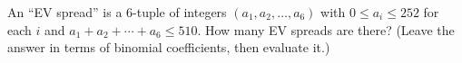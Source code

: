 An ``EV spread'' is a $6$-tuple of integers $(a_1,a_2,\dots,a_6)$ with $0\le a_i\le252$ for each $i$ and $a_1+a_2+\cdots+a_6\le510$. How many EV spreads are there? (Leave the answer in terms of binomial coefficients, then evaluate it.)
